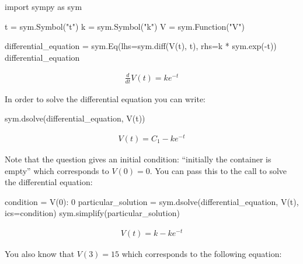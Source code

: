 \begin{pyin}
import sympy as sym

t = sym.Symbol("t")
k = sym.Symbol("k")
V = sym.Function("V")

differential_equation = sym.Eq(lhs=sym.diff(V(t), t), rhs=k * sym.exp(-t))
differential_equation
\end{pyin}




\begin{equation*}
\begin{split}\displaystyle \frac{d}{d t} V{\left(t \right)} = k e^{- t}\end{split}
\end{equation*}




In order to solve the differential equation you can write:




\begin{pyin}
sym.dsolve(differential_equation, V(t))
\end{pyin}




\begin{equation*}
\begin{split}\displaystyle V{\left(t \right)} = C_{1} - k e^{- t}\end{split}
\end{equation*}




Note that the question gives an initial condition: ``initially the container
is empty” which corresponds to \(V(0)=0\).
You can pass this to the call to solve the differential equation:




\begin{pyin}
condition = {V(0): 0}
particular_solution = sym.dsolve(differential_equation, V(t), ics=condition)
sym.simplify(particular_solution)
\end{pyin}




\begin{equation*}
\begin{split}\displaystyle V{\left(t \right)} = k - k e^{- t}\end{split}
\end{equation*}




You also know that \(V(3)=15\) which corresponds to the following equation:




